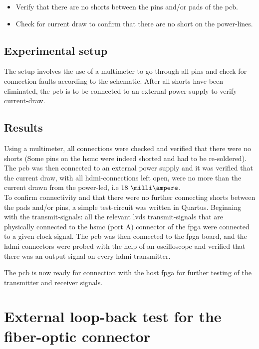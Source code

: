 \documentclass[main.tex]{subfiles}
\begin{document}
\begin{itemize}
\item Verify that there are no shorts between the pins and/or pads of the \gls{pcb}. 
\item Check for current draw to confirm that there are no short on the power-lines.
\end{itemize}

\subsection{Experimental setup}

The setup involves the use of a multimeter to go through all pins and check for connection faults according to the schematic. After all shorts have been eliminated, the \gls{pcb} is to be connected to an external power supply to verify current-draw. 

\subsection{Results}
 Using a multimeter, all connections were checked and verified that there were no shorts (Some pins on the \gls{hsmc} were indeed shorted and had to be re-soldered). The \gls{pcb} was then connected to an external power supply and it was verified that the current draw, with all \gls{hdmi}-connections left open, were no more than the current drawn from the power-\acrshort{led}, i.e $18~\milli\ampere$. \\

To confirm connectivity and that there were no further connecting shorts between the pads and/or pins, a simple test-circuit was written in Quartus. Beginning with the transmit-signals: all the relevant \gls{lvds} transmit-signals that are physically connected to the \gls{hsmc} (port A) connector of the \gls{fpga} were connected to a given clock signal. The \gls{pcb} was then connected to the \gls{fpga} board, and the \gls{hdmi} connectors were probed with the help of an oscilloscope and verified that there was an output signal on every \gls{hdmi}-transmitter. 

The \gls{pcb} is now ready for connection with the host \gls{fpga} for further testing of the transmitter and receiver signals. 

\section{External loop-back test for the fiber-optic connector}
\end{document}

